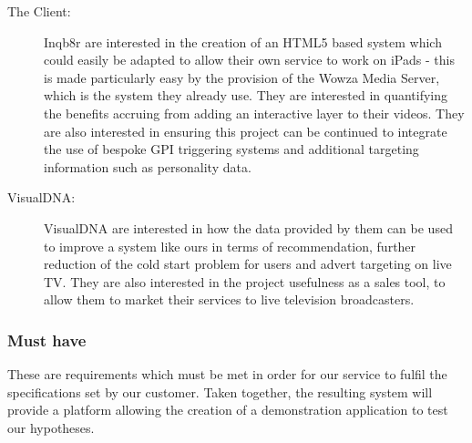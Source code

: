 \begin{description}
\item[The Client:]{Inqb8r are interested in the creation of an HTML5 based system which could easily be adapted to allow their own service to work on iPads - this is made particularly easy by the provision of the Wowza Media Server, which is the system they already use. They are interested in quantifying the benefits accruing from adding an interactive layer to their videos. They are also interested in ensuring this project can be continued to integrate the use of bespoke GPI triggering systems and additional targeting information such as personality data.}
\item[VisualDNA:]{VisualDNA are interested in how the data provided by them can be used to improve a system like ours in terms of recommendation, further reduction of the cold start problem for users and advert targeting on live TV. They are also interested in the project usefulness as a sales tool, to allow them to market their services to live television broadcasters.}
\end{description}

\subsubsection{Must have}
	These are requirements which must be met in order for our service to fulfil the specifications set by our customer. Taken together, the resulting system will provide a platform allowing the creation of a demonstration application to test our hypotheses.
